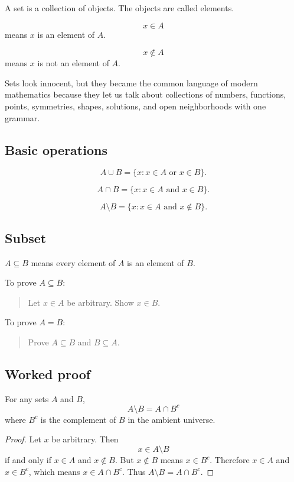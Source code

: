 \documentclass[11pt]{article}
\begin{document}
A set is a collection of objects. The objects are called elements.

\[
x\in A
\]
means $x$ is an element of $A$.

\[
x\notin A
\]
means $x$ is not an element of $A$.

Sets look innocent, but they became the common language of modern mathematics because they let us talk about collections of numbers, functions, points, symmetries, shapes, solutions, and open neighborhoods with one grammar.

\subsection{Basic operations}

\[
A\cup B=\{x:x\in A \text{ or } x\in B\}.
\]

\[
A\cap B=\{x:x\in A \text{ and } x\in B\}.
\]

\[
A\setminus B=\{x:x\in A \text{ and } x\notin B\}.
\]

\subsection{Subset}

\begin{definition}
$A\subseteq B$ means every element of $A$ is an element of $B$.
\end{definition}

To prove $A\subseteq B$:

\begin{quote}
Let $x\in A$ be arbitrary. Show $x\in B$.
\end{quote}

To prove $A=B$:

\begin{quote}
Prove $A\subseteq B$ and $B\subseteq A$.
\end{quote}

\subsection{Worked proof}

\begin{theorem}
For any sets $A$ and $B$,
\[
A\setminus B=A\cap B^c
\]
where $B^c$ is the complement of $B$ in the ambient universe.
\end{theorem}

\begin{proof}
Let $x$ be arbitrary. Then
\[
x\in A\setminus B
\]
if and only if $x\in A$ and $x\notin B$. But $x\notin B$ means $x\in B^c$. Therefore $x\in A$ and $x\in B^c$, which means $x\in A\cap B^c$. Thus $A\setminus B=A\cap B^c$.
\end{proof}
\end{document}
